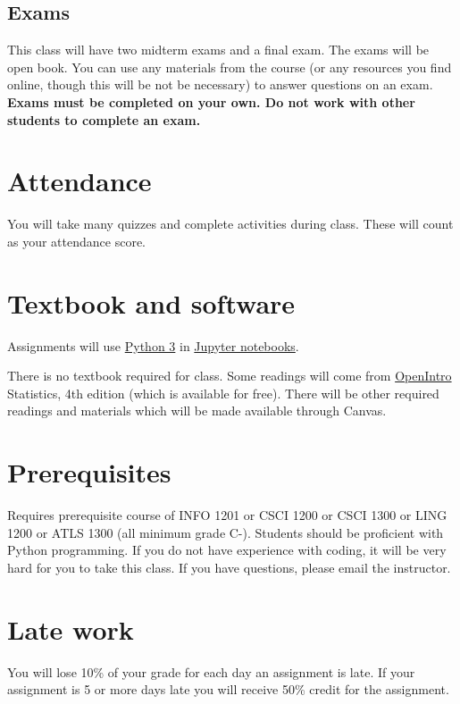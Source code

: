 \documentclass[10pt]{memoir}
\begin{document}
\subsection{\textbf{Exams}}
This class will have two midterm exams and a final exam. The exams will be open book. You can use any materials from the course (or any resources you find online, though this will be not be necessary) to answer questions on an exam. \textbf{Exams must be completed on your own. Do not work with other students to complete an exam.}

\section{\textbf{Attendance}}
You will take many quizzes and complete activities during class. These will count as your attendance score. 

\section{\textbf{Textbook and software}}

Assignments will use \href{https://www.python.org/}{Python 3} in \href{https://jupyter.org/}{Jupyter notebooks}. 

There is no textbook required for class. Some readings will come from \href{https://www.abehandler.com/resources/openintro-statistics.pdf}{OpenIntro} Statistics, 4th edition (which is available for free). There will be other required readings and materials which will be made available through Canvas.

\section{\textbf{Prerequisites}}

Requires prerequisite course of INFO 1201 or CSCI 1200 or CSCI 1300 or LING 1200 or ATLS 1300 (all minimum grade C-). Students should be proficient with Python programming. If you do not have experience with coding, it will be very hard for you to take this class. If you have questions, please email the instructor.

\section{\textbf{Late work}}
You will lose 10\% of your grade for each day an assignment is late. If your assignment is 5 or more days late you will receive 50\% credit for the assignment. 
\end{document}

